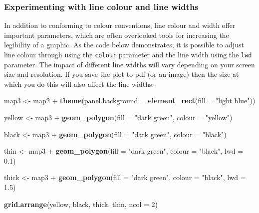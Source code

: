 \documentclass[]{article}
\newenvironment{Shaded}{}{}
\newcommand{\KeywordTok}[1]{\textcolor[rgb]{0.00,0.44,0.13}{\textbf{{#1}}}}
\newcommand{\DataTypeTok}[1]{\textcolor[rgb]{0.56,0.13,0.00}{{#1}}}
\newcommand{\DecValTok}[1]{\textcolor[rgb]{0.25,0.63,0.44}{{#1}}}
\newcommand{\FloatTok}[1]{\textcolor[rgb]{0.25,0.63,0.44}{{#1}}}
\newcommand{\StringTok}[1]{\textcolor[rgb]{0.25,0.44,0.63}{{#1}}}
\newcommand{\NormalTok}[1]{{#1}}
\begin{document}
\subsubsection{Experimenting with line colour and line widths}

In addition to conforming to colour conventions, line colour and width
offer important parameters, which are often overlooked tools for
increasing the legibility of a graphic. As the code below demonstrates,
it is possible to adjust line colour through using the \texttt{colour}
parameter and the line width using the \texttt{lwd} parameter. The
impact of different line widths will vary depending on your screen size
and resolution. If you save the plot to pdf (or an image) then the size
at which you do this will also affect the line widths.

\begin{Shaded}
\begin{Highlighting}[]
\NormalTok{map3 <- map2 + }\KeywordTok{theme}\NormalTok{(}\DataTypeTok{panel.background =} \KeywordTok{element_rect}\NormalTok{(}\DataTypeTok{fill =} \StringTok{"light blue"}\NormalTok{))}

\NormalTok{yellow <- map3 + }\KeywordTok{geom_polygon}\NormalTok{(}\DataTypeTok{fill =} \StringTok{"dark green"}\NormalTok{, }\DataTypeTok{colour =} \StringTok{"yellow"}\NormalTok{)}

\NormalTok{black <- map3 + }\KeywordTok{geom_polygon}\NormalTok{(}\DataTypeTok{fill =} \StringTok{"dark green"}\NormalTok{, }\DataTypeTok{colour =} \StringTok{"black"}\NormalTok{)}

\NormalTok{thin <- map3 + }\KeywordTok{geom_polygon}\NormalTok{(}\DataTypeTok{fill =} \StringTok{"dark green"}\NormalTok{, }\DataTypeTok{colour =} \StringTok{"black"}\NormalTok{, }\DataTypeTok{lwd =} \FloatTok{0.1}\NormalTok{)}

\NormalTok{thick <- map3 + }\KeywordTok{geom_polygon}\NormalTok{(}\DataTypeTok{fill =} \StringTok{"dark green"}\NormalTok{, }\DataTypeTok{colour =} \StringTok{"black"}\NormalTok{, }\DataTypeTok{lwd =} \FloatTok{1.5}\NormalTok{)}

\KeywordTok{grid.arrange}\NormalTok{(yellow, black, thick, thin, }\DataTypeTok{ncol =} \DecValTok{2}\NormalTok{)}
\end{Highlighting}
\end{Shaded}
\end{document}
